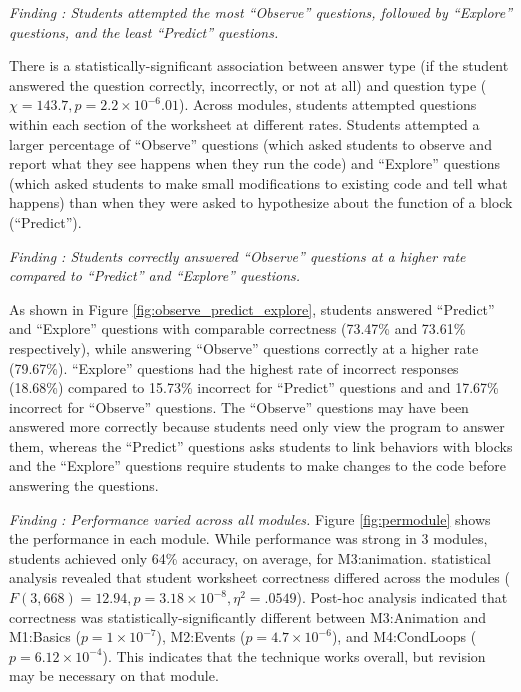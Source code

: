 \documentclass[sigconf,manuscript,review,anonymous]{acmart} %
\begin{document}
\textit{Finding : Students attempted the most ``Observe'' questions, followed by ``Explore'' questions, and the least ``Predict'' questions.}

There is a statistically-significant association between answer type (if the student answered the question correctly, incorrectly, or not at all) and question type (\begin{math}\chi=143.7, p=2.2\times10^{-6}.01\end{math}). Across modules, students attempted questions within each section of the worksheet at different rates. Students attempted a larger percentage of ``Observe'' questions (which asked students to observe and report what they see happens when they run the code) and ``Explore'' questions (which asked students to make small modifications to existing code and tell what happens) than when they were asked to hypothesize about the function of a block (``Predict''). 

\textit{Finding : Students correctly answered ``Observe'' questions at a higher rate compared to ``Predict'' and ``Explore'' questions.} 

As shown in Figure \ref{fig:observe_predict_explore}, students answered ``Predict'' and ``Explore'' questions with comparable correctness (73.47\% and 73.61\% respectively), while answering ``Observe'' questions correctly at a higher rate (79.67\%). ``Explore'' questions had the highest rate of incorrect responses (18.68\%) compared to 15.73\% incorrect for ``Predict'' questions and and 17.67\% incorrect for ``Observe'' questions. The ``Observe'' questions may have been answered more correctly because students need only view the program to answer them, whereas the ``Predict'' questions asks students to link behaviors with blocks and the ``Explore'' questions require students to make changes to the code before answering the questions.


\textit{Finding : Performance varied across all modules.}
Figure \ref{fig:permodule} shows the performance in each module. While performance was strong in 3 modules, students achieved only 64\% accuracy, on average, for M3:animation. statistical analysis revealed that student worksheet correctness differed across the modules (\begin{math}F(3,668)=12.94, p=3.18\times10^{-8}, \eta^2=.0549\end{math}). Post-hoc analysis indicated that correctness was statistically-significantly different between M3:Animation and M1:Basics (\begin{math}p=1\times10^{-7}\end{math}), M2:Events (\begin{math}p=4.7\times10^{-6}\end{math}), and M4:CondLoops (\begin{math}p=6.12\times10^{-4}\end{math}). This indicates that the technique works overall, but revision may be necessary on that module.
\end{document}
